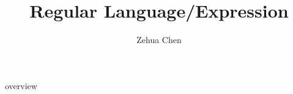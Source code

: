 \documentclass{report}
\title{Regular Language/Expression}
\author{Zehua Chen}
\begin{document}
  \maketitle
  \tableofcontents

  {overview}
\end{document}
